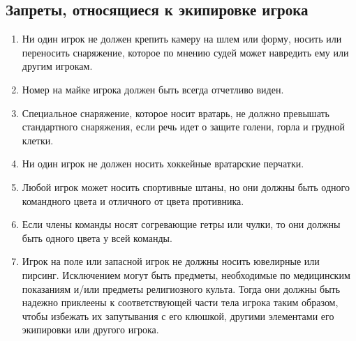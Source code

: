 \documentclass[../main.tex]{subfiles}
\begin{document}
\subsection{Запреты, относящиеся к экипировке игрока}
\begin{enumerate}
\item Ни один игрок не должен крепить камеру на шлем или форму, носить или переносить снаряжение, которое по мнению судей может навредить ему или другим игрокам.
\item Номер на майке игрока должен быть всегда отчетливо виден.
\item Специальное снаряжение, которое носит вратарь, не должно превышать стандартного снаряжения, если речь идет о защите голени, горла и грудной клетки.
\item Ни один игрок не должен носить хоккейные вратарские перчатки.
\item Любой игрок может носить спортивные штаны, но они должны быть одного командного цвета и отличного от цвета противника.
\item Если члены команды носят согревающие гетры или чулки, то они должны быть одного цвета у всей команды.
\item Игрок на поле или запасной игрок не должны носить ювелирные или пирсинг.\newline
Исключением могут быть предметы, необходимые по медицинским показаниям и/или предметы религиозного культа.\newline
Тогда они должны быть надежно приклеены к соответствующей части тела игрока таким образом, чтобы избежать их запутывания с его клюшкой, другими элементами его экипировки или другого игрока.
\end{enumerate}
\end{document}
